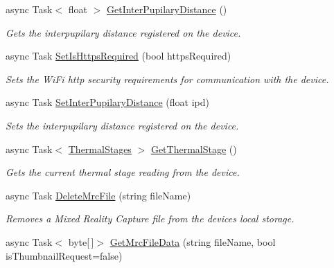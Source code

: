 \begin{DoxyCompactItemize}
async Task$<$ float $>$ \hyperlink{class_microsoft_1_1_tools_1_1_windows_device_portal_1_1_device_portal_a3e010fcad0087ae6633a47b2bf921614}{Get\+Inter\+Pupilary\+Distance} ()
\begin{DoxyCompactList}\small\item\em Gets the interpupilary distance registered on the device. \end{DoxyCompactList}\item 
async Task \hyperlink{class_microsoft_1_1_tools_1_1_windows_device_portal_1_1_device_portal_ab5c59e960213f95413950a470d037111}{Set\+Is\+Https\+Required} (bool https\+Required)
\begin{DoxyCompactList}\small\item\em Sets the Wi\+Fi http security requirements for communication with the device. \end{DoxyCompactList}\item 
async Task \hyperlink{class_microsoft_1_1_tools_1_1_windows_device_portal_1_1_device_portal_a251151f930fffd8a5e09c20ed73a2a9a}{Set\+Inter\+Pupilary\+Distance} (float ipd)
\begin{DoxyCompactList}\small\item\em Sets the interpupilary distance registered on the device. \end{DoxyCompactList}\item 
async Task$<$ \hyperlink{namespace_microsoft_1_1_tools_1_1_windows_device_portal_aba1cf1ca5947296337c5aedd4fa37bf4}{Thermal\+Stages} $>$ \hyperlink{class_microsoft_1_1_tools_1_1_windows_device_portal_1_1_device_portal_ac9e739f02b60870188d99565deaf4614}{Get\+Thermal\+Stage} ()
\begin{DoxyCompactList}\small\item\em Gets the current thermal stage reading from the device. \end{DoxyCompactList}\item 
async Task \hyperlink{class_microsoft_1_1_tools_1_1_windows_device_portal_1_1_device_portal_a83cf4c3cb73799c3595c452b513155c3}{Delete\+Mrc\+File} (string file\+Name)
\begin{DoxyCompactList}\small\item\em Removes a Mixed Reality Capture file from the device\textquotesingle{}s local storage. \end{DoxyCompactList}\item 
async Task$<$ byte\mbox{[}$\,$\mbox{]}$>$ \hyperlink{class_microsoft_1_1_tools_1_1_windows_device_portal_1_1_device_portal_a88735e605c8d038f8155b10a1b0e2d2a}{Get\+Mrc\+File\+Data} (string file\+Name, bool is\+Thumbnail\+Request=false)

\end{DoxyCompactItemize}
